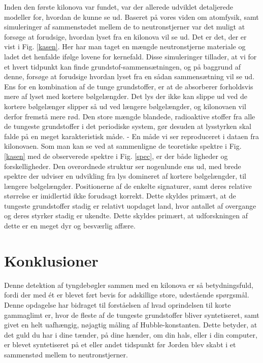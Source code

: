 \documentclass[twocolumn]{article}
\begin{document}
Inden den første kilonova var fundet, var der allerede udviklet detaljerede modeller for, hvordan de kunne se ud. Baseret på vores viden om atomfysik, samt simuleringer af sammenstødet mellem de to neutronstjerner var det muligt at forsøge at forudsige, hvordan lyset fra en kilonova vil se ud. Det er det, der er vist i Fig. \ref{kasen}. Her har man taget en mængde neutronstjerne materiale og ladet det henfalde ifølge lovene for kernefald. Disse simuleringer tillader, at vi for et hvert tidpunkt kan finde grundstof-sammensætningen, og på baggrund af denne, forsøge at forudsige hvordan lyset fra en sådan sammensætning vil se ud. Ens for en kombination af de tunge grundstoffer, er at de absorberer forholdsvis mere af lyset med kortere bølgelængder. Det lys der ikke kan slippe ud ved de kortere bølgelænger slipper så ud ved længere bølgelængder, og kilonovaen vil derfor fremstå mere rød. Den store mængde blandede, radioaktive  stoffer fra alle de tungeste grundstoffer i det periodiske system, gør desuden at lysstyrken skal falde på en meget karakteristisk måde. - En måde vi ser reproduceret i dataen fra kilonovaen. Som man kan se ved at sammenligne de teoretiske spektre i Fig. \ref{kasen} med de observerede spektre i Fig. \ref{spec}, er der både ligheder og forskelligheder. Den overordnede struktur ser nogenlunde ens ud, med brede spektre der udviser en udvikling fra lys domineret af kortere bølgelængder, til længere bølgelængder. Positionerne af de enkelte signaturer, samt deres relative størrelse er imidlertid ikke forudsagt korrekt. Dette skyldes primært, at de tungeste grundstoffer stadig er relativt uopdaget land, hvor antallet af overgange og deres styrker stadig er ukendte. Dette skyldes primært, at udforskningen af dette er en meget dyr og besværlig affære.



\section{Konklusioner}
Denne detektion af tyngdebøgler sammen med en kilonova er så betydningsfuld, fordi der med ét er blevet ført bevis for adskillige store, udestående spørgsmål. Denne opdagelse har bidraget til forståelsen af hvad oprindelsen til korte gammaglimt er, hvor de fleste af de tungeste grundstoffer bliver syntetiseret, samt givet en helt uafhængig, nøjagtig måling af Hubble-konstanten. Dette betyder, at det guld du har i dine tænder, på dine hænder, om din hals, eller i din computer, er blevet syntetiseret på et eller andet tidspunkt før Jorden blev skabt i et sammenstød mellem to neutronstjerner. 
\end{document}
